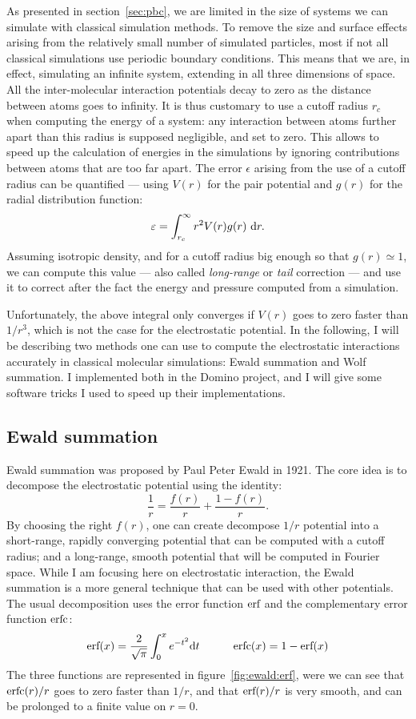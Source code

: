 \documentclass[thesis]{subfiles}
\begin{document}
As presented in section~\ref{sec:pbc}, we are limited in the size of systems we
can simulate with classical simulation methods. To remove the size and surface
effects arising from the relatively small number of simulated particles, most if
not all classical simulations use periodic boundary conditions. This means that
we are, in effect, simulating an infinite system, extending in all three
dimensions of space. All the inter-molecular interaction potentials decay to
zero as the distance between atoms goes to infinity. It is thus customary to use
a cutoff radius $r_c$ when computing the energy of a system: any interaction
between atoms further apart than this radius is supposed negligible, and set to
zero. This allows to speed up the calculation of energies in the simulations by
ignoring contributions between atoms that are too far apart. The error
$\epsilon$ arising from the use of a cutoff radius can be quantified --- using
$V(r)$ for the pair potential and $g(r)$ for the radial distribution function:
\[\varepsilon = \int_{r_c}^\infty r^2 V(r) g(r)\ \text{d} r. \]
Assuming isotropic density, and for a cutoff radius big enough so that $g(r)
\simeq 1$, we can compute this value --- also called \emph{long-range} or
\emph{tail} correction --- and use it to correct after the fact the energy and
pressure computed from a simulation.

Unfortunately, the above integral only converges if $V(r)$ goes to zero faster
than $1/r^3$, which is not the case for the electrostatic potential. In the
following, I will be describing two methods one can use to compute the
electrostatic interactions accurately in classical molecular simulations: Ewald
summation and Wolf summation. I implemented both in the Domino project, and I
will give some software tricks I used to speed up their implementations.

\subsection{Ewald summation}

Ewald summation was proposed by Paul Peter Ewald in 1921\cite{Ewald1921}. The
core idea is to decompose the electrostatic potential using the identity:
\[ \frac{1}{r} = \frac{f(r)}{r} + \frac{1 - f(r)}{r}. \]
By choosing the right $f(r)$, one can create decompose $1/r$ potential into a
short-range, rapidly converging potential that can be computed with a cutoff
radius; and a long-range, smooth potential that will be computed in Fourier
space. While I am focusing here on electrostatic interaction, the Ewald
summation is a more general technique that can be used with other potentials.
The usual decomposition uses the error function ${\normalfont\text{erf}}$ and the complementary
error function ${\normalfont\text{erfc}}$:
\[{\normalfont\text{erf}}(x) = \frac{2}{\sqrt\pi} \int_0^x e^{-t^2} \text{d} t \hskip3em {\normalfont\text{erfc}}(x) = 1 - {\normalfont\text{erf}}(x)\]
The three functions are represented in figure~\ref{fig:ewald:erf}, were we can
see that ${\normalfont\text{erfc}}(r)/r$ goes to zero faster than $1/r$, and that ${\normalfont\text{erf}}(r)/r$ is
very smooth, and can be prolonged to a finite value on $r = 0$.
\end{document}
